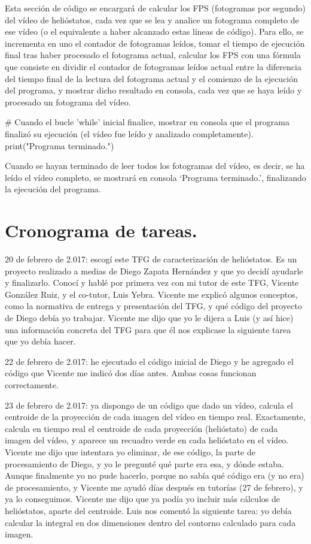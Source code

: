 \documentclass[12pt]{article}
\begin{document}
Esta sección de código se encargará de calcular los FPS (fotogramas por segundo) del vídeo de helióstatos, cada vez que se lea y analice un fotograma completo de ese vídeo (o el equivalente a haber alcanzado estas líneas de código). Para ello, se incrementa en uno el contador de fotogramas leídos, tomar el tiempo de ejecución final tras haber procesado el fotograma actual, calcular los FPS con una fórmula que consiste en dividir el contador de fotogramas leídos actual entre la diferencia del tiempo final de la lectura del fotograma actual y el comienzo de la ejecución del programa, y mostrar dicho resultado en consola, cada vez que se haya leído y procesado un fotograma del vídeo.


\# Cuando el bucle 'while' inicial finalice, mostrar en consola que el programa finalizó su ejecución (el vídeo fue leído y analizado completamente).
print("Programa terminado.")

Cuando se hayan terminado de leer todos los fotogramas del vídeo, es decir, se ha leído el vídeo completo, se mostrará en consola ‘Programa terminado.’, finalizando la ejecución del programa.

\section{Cronograma de tareas.}

20 de febrero de 2.017: escogí este TFG de caracterización de helióstatos. Es un proyecto realizado a medias de Diego Zapata Hernández y que yo decidí ayudarle y finalizarlo. Conocí y hablé por primera vez con mi tutor de este TFG, Vicente González Ruiz, y el co-tutor, Luis Yebra. Vicente me explicó algunos conceptos, como la normativa de entrega y presentación del TFG, y qué código del proyecto de Diego debía yo trabajar. Vicente me dijo que yo le dijera a Luis (y así hice) una información concreta del TFG para que él nos explicase la siguiente tarea que yo debía hacer.

22 de febrero de 2.017: he ejecutado el código inicial de Diego y he agregado el código que Vicente me indicó dos días antes. Ambas cosas funcionan correctamente.

23 de febrero de 2.017: ya dispongo de un código que dado un vídeo, calcula el centroide de la proyección de cada imagen del vídeo en tiempo real. Exactamente, calcula en tiempo real el centroide de cada proyección (helióstato) de cada imagen del vídeo, y aparece un recuadro verde en cada helióstato en el vídeo. Vicente me dijo que intentara yo eliminar, de ese código, la parte de procesamiento de Diego, y yo le pregunté qué parte era esa, y dónde estaba. Aunque finalmente yo no pude hacerlo, porque no sabía qué código era (y no era) de procesamiento, y Vicente me ayudó días después en tutorías (27 de febrero), y ya lo conseguimos. Vicente me dijo que ya podía yo incluir más cálculos de helióstatos, aparte del centroide. Luis nos comentó la siguiente tarea: yo debía calcular la integral en dos dimensiones dentro del contorno calculado para cada imagen.
\end{document}
